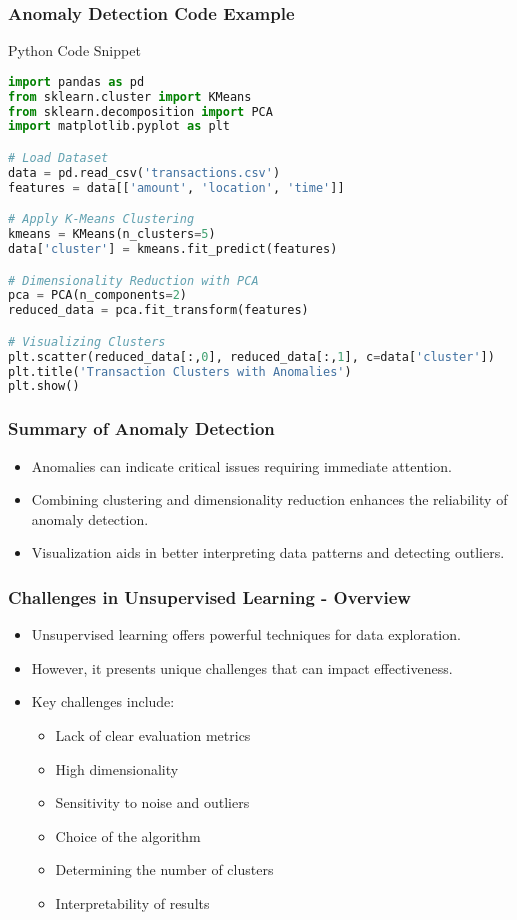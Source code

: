 \documentclass[aspectratio=169]{beamer}
\begin{document}
\begin{frame}[fragile]
    \frametitle{Anomaly Detection Code Example}
    \begin{block}{Python Code Snippet}
    \begin{lstlisting}[language=Python]
import pandas as pd
from sklearn.cluster import KMeans
from sklearn.decomposition import PCA
import matplotlib.pyplot as plt

# Load Dataset
data = pd.read_csv('transactions.csv')
features = data[['amount', 'location', 'time']]

# Apply K-Means Clustering
kmeans = KMeans(n_clusters=5)
data['cluster'] = kmeans.fit_predict(features)

# Dimensionality Reduction with PCA
pca = PCA(n_components=2)
reduced_data = pca.fit_transform(features)

# Visualizing Clusters
plt.scatter(reduced_data[:,0], reduced_data[:,1], c=data['cluster'])
plt.title('Transaction Clusters with Anomalies')
plt.show()
    \end{lstlisting}
    \end{block}
\end{frame}

\begin{frame}[fragile]
    \frametitle{Summary of Anomaly Detection}
    \begin{itemize}
        \item Anomalies can indicate critical issues requiring immediate attention.
        \item Combining clustering and dimensionality reduction enhances the reliability of anomaly detection.
        \item Visualization aids in better interpreting data patterns and detecting outliers.
    \end{itemize}
\end{frame}

\begin{frame}[fragile]
    \frametitle{Challenges in Unsupervised Learning - Overview}
    \begin{itemize}
        \item Unsupervised learning offers powerful techniques for data exploration.
        \item However, it presents unique challenges that can impact effectiveness.
        \item Key challenges include:
          \begin{itemize}
              \item Lack of clear evaluation metrics
              \item High dimensionality
              \item Sensitivity to noise and outliers
              \item Choice of the algorithm
              \item Determining the number of clusters
              \item Interpretability of results
          \end{itemize}
    \end{itemize}
\end{frame}
\end{document}

